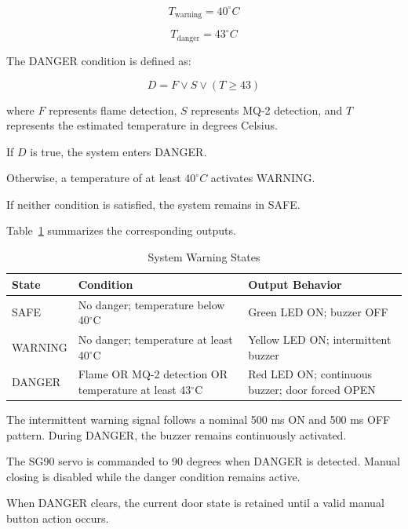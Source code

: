 \documentclass[12pt,a4paper]{article}
\begin{document}
\begin{equation}
T_{\mathrm{warning}} = 40^\circ C
\end{equation}

\begin{equation}
T_{\mathrm{danger}} = 43^\circ C
\end{equation}

The DANGER condition is defined as:

\begin{equation}
D = F \lor S \lor (T \geq 43)
\end{equation}

where $F$ represents flame detection,
$S$ represents MQ-2 detection, and $T$
represents the estimated temperature
in degrees Celsius.

If $D$ is true, the system enters DANGER.

Otherwise, a temperature of at least
$40^\circ C$ activates WARNING.

If neither condition is satisfied,
the system remains in SAFE.

Table~\ref{tab:states} summarizes the
corresponding outputs.

\begin{table}[!htbp]
\centering
\caption{System Warning States}
\label{tab:states}
\renewcommand{\arraystretch}{1.2}
\begin{tabular}{|p{2.2cm}|p{5cm}|p{5cm}|}
\hline
\textbf{State} &
\textbf{Condition} &
\textbf{Output Behavior} \\
\hline
SAFE &
No danger; temperature below 40$^\circ$C &
Green LED ON; buzzer OFF \\
\hline
WARNING &
No danger; temperature at least 40$^\circ$C &
Yellow LED ON; intermittent buzzer \\
\hline
DANGER &
Flame OR MQ-2 detection OR temperature
at least 43$^\circ$C &
Red LED ON; continuous buzzer;
door forced OPEN \\
\hline
\end{tabular}
\end{table}
\FloatBarrier

The intermittent warning signal follows
a nominal 500 ms ON and 500 ms OFF pattern.
During DANGER, the buzzer remains continuously
activated.

The SG90 servo is commanded to 90 degrees
when DANGER is detected. Manual closing
is disabled while the danger condition
remains active.

When DANGER clears, the current door state
is retained until a valid manual button
action occurs.
\end{document}
